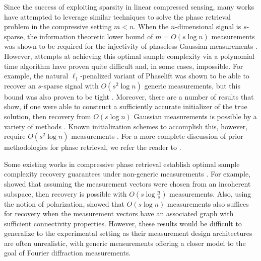 \documentclass[11pt]{article}
\theoremstyle{remark}
\begin{document}
Since the success of exploiting sparsity in linear compressed sensing, many works have attempted to leverage similar techniques to solve the phase retrieval problem in the compressive setting $m < n$. When the $n$-dimensional signal is $s$-sparse, the information theoretic lower bound of $m = O(s \log n)$ measurements was shown to be required for the injectivity of phaseless Gaussian measurements \cite{VladSRIP2014}. However, attempts at achieving this optimal sample complexity via a polynomial time algorithm have proven quite difficult and, in some cases, impossible. For example, the natural $\ell_1$-penalized variant of Phaselift was shown to be able to recover an $s$-sparse signal with $O(s^2 \log n)$ generic measurements, but this bound was also proven to be tight \cite{Voroninski2013, Oymaketal15}. Moreover, there are a number of results that show, if one were able to construct a sufficiently accurate initializer of the true solution, then recovery from $O(s \log n)$ Gaussian measurements is possible by a variety of methods \cite{HV2016,SPARTA,Mahdi2019}. Known initialization schemes to accomplish this, however, require $O(s^2 \log n)$ measurements \cite{Cai2016}. For a more complete discussion of prior methodologies for phase retrieval, we refer the reader to \cite{Numerics_of_PR}.

Some existing works in compressive phase retrieval establish optimal sample complexity recovery guarantees under non-generic measurements \cite{SparsePRoverview}.  For example, \cite{Romberg2015} showed that assuming the measurement vectors were chosen from an incoherent subspace, then recovery is possible with $O(s \log \frac{n}{s})$ measurements. Also, using the notion of polarization, \cite{Bandeira_Mixon} showed that $O(s \log n)$ measurements also suffices for recovery when the measurement vectors have an associated graph with sufficient connectivity properties. However, these results would be difficult to generalize to the experimental setting as their measurement design architectures are often unrealistic, with generic measurements offering a closer model to the goal of Fourier diffraction  measurements.

\end{document}
